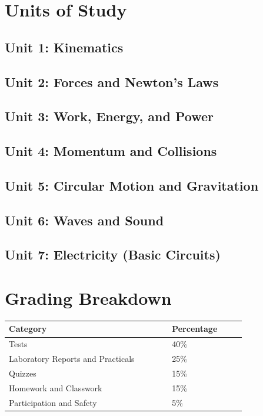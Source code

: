 \documentclass[12pt,oneside]{book}
\begin{document}
\section{Units of Study}
\subsection*{Unit 1: Kinematics}
\subsection*{Unit 2: Forces and Newton's Laws}
\subsection*{Unit 3: Work, Energy, and Power}
\subsection*{Unit 4: Momentum and Collisions}
\subsection*{Unit 5: Circular Motion and Gravitation}
\subsection*{Unit 6: Waves and Sound}
\subsection*{Unit 7: Electricity (Basic Circuits)}

\section{Grading Breakdown}
\begin{center}
\begin{tabular}{L{0.55\linewidth}L{0.25\linewidth}}
\toprule
\textbf{Category} & \textbf{Percentage} \\
\midrule
Tests & 40\% \\
Laboratory Reports and Practicals & 25\% \\
Quizzes & 15\% \\
Homework and Classwork & 15\% \\
Participation and Safety & 5\% \\
\bottomrule
\end{tabular}
\end{center}
\end{document}
